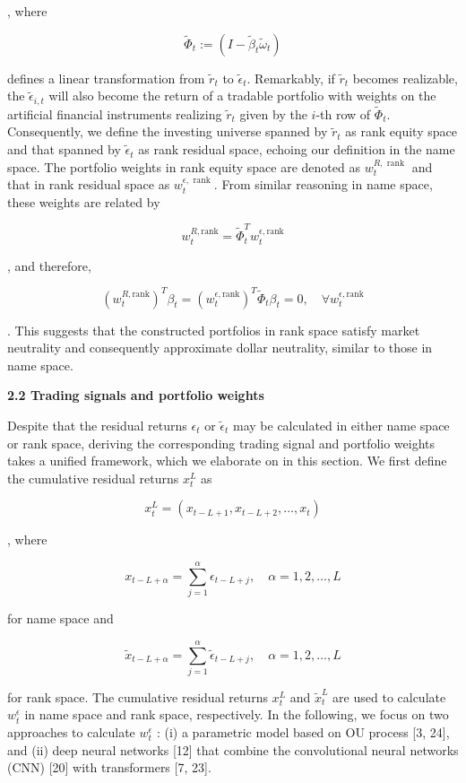 \documentclass[12pt,article]{memoir}
\begin{document}
, where

$$
\tilde{\Phi}_t:=\left(I-\tilde{\beta}_t \tilde{\omega}_t\right)
$$

defines a linear transformation from $\tilde{r}_t$ to $\tilde{\epsilon}_t$. Remarkably, if $\tilde{r}_t$ becomes realizable, the $\tilde{\epsilon}_{i, t}$ will also become the return of a tradable portfolio with weights on the artificial financial instruments realizing $\tilde{r}_t$ given by the $i$-th row of $\tilde{\Phi}_t$. Consequently, we define the investing universe spanned by $\tilde{r}_t$ as rank equity space and that spanned by $\tilde{\epsilon}_t$ as rank residual space, echoing our definition in the name space. The portfolio weights in rank equity space are denoted as $w_t^{R, \text { rank }}$ and that in rank residual space as $w_t^{\epsilon, \text { rank }}$. From similar reasoning in name space, these weights are related by

$$
w_t^{R, \mathrm{rank}}=\tilde{\Phi}_t^T w_t^{\epsilon, \mathrm{rank}}
$$

, and therefore,

$$
\left(w_t^{R, \mathrm{rank}}\right)^T \beta_t=\left(w_t^{\epsilon, \mathrm{rank}}\right)^T \tilde{\Phi}_t \beta_t=0, \quad \forall w_t^{\epsilon, \mathrm{rank}}
$$

. This suggests that the constructed portfolios in rank space satisfy market neutrality and consequently approximate dollar neutrality, similar to those in name space.

\mx 
\textbf{2.2 Trading signals and portfolio weights}

Despite that the residual returns $\epsilon_t$ or $\tilde{\epsilon}_t$ may be calculated in either name space or rank space, deriving the corresponding trading signal and portfolio weights takes a unified framework, which we elaborate on in this section. We first define the cumulative residual returns $x_t^L$ as

$$
x_t^L=\left(x_{t-L+1}, x_{t-L+2}, \ldots, x_t\right)
$$

, where

$$
x_{t-L+\alpha}=\sum_{j=1}^\alpha \epsilon_{t-L+j}, \quad \alpha=1,2, \ldots, L
$$

for name space and

$$
\tilde{x}_{t-L+\alpha}=\sum_{j=1}^\alpha \tilde{\epsilon}_{t-L+j}, \quad \alpha=1,2, \ldots, L
$$

for rank space. The cumulative residual returns $x_t^L$ and $\tilde{x}_t^L$ are used to calculate $w_t^\epsilon$ in name space and rank space, respectively. In the following, we focus on two approaches to calculate $w_t^\epsilon$ : (i) a parametric model based on OU process [3, 24], and (ii) deep neural networks [12] that combine the convolutional neural networks (CNN) [20] with transformers [7, 23].
\end{document}
